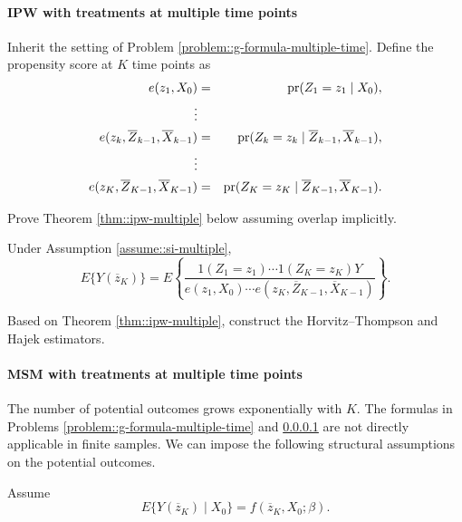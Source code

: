  
 \paragraph{IPW with treatments at multiple time points}\label{problem::ipw-multiple-time}

Inherit the setting of Problem \ref{problem::g-formula-multiple-time}. Define the propensity score at $K$ time points as
\begin{eqnarray*}
e(z_1, X_0) &=& \textup{pr}(Z_1 = z_1\mid X_0) ,\\
\vdots \\
e(z_k, \overline{Z}_{k-1},  \overline{X}_{k-1}) &=&  \textup{pr}(Z_k = z_k \mid \overline{Z}_{k-1},  \overline{X}_{k-1}) ,\\
\vdots \\
e(z_K, \overline{Z}_{K-1},  \overline{X}_{K-1}) &=&  \textup{pr}(Z_K = z_K \mid \overline{Z}_{K-1},  \overline{X}_{K-1}) .
\end{eqnarray*}


Prove Theorem \ref{thm::ipw-multiple} below assuming overlap implicitly. 


\begin{theorem}
\label{thm::ipw-multiple}
Under Assumption \ref{assume::si-multiple},
$$
  E\{ Y(\overline{z}_K)  \}   = E\left\{  
  \frac{1(Z_1 = z_1) \cdots  1( Z_K = z_K) Y}{    e(z_1, X_0)  \cdots  e(z_K, \overline{Z}_{K-1},  \overline{X}_{K-1})   }
  \right\}.
$$
\end{theorem}


Based on Theorem \ref{thm::ipw-multiple}, construct the Horvitz--Thompson and Hajek estimators. 


 \paragraph{MSM with treatments at multiple time points}\label{problem::msm-multiple-time}


The number of potential outcomes grows exponentially with $K$. The formulas in Problems \ref{problem::g-formula-multiple-time} and \ref{problem::ipw-multiple-time} are not directly applicable in finite samples. We can impose the following structural assumptions on the potential outcomes.


\begin{definition}
\label{definition::msm-multiple}
Assume 
$$
  E\{ Y(\overline{z}_K)  \mid X_0\}  = f(\overline{z}_K, X_0 ; \beta  ).
$$
\end{definition}


